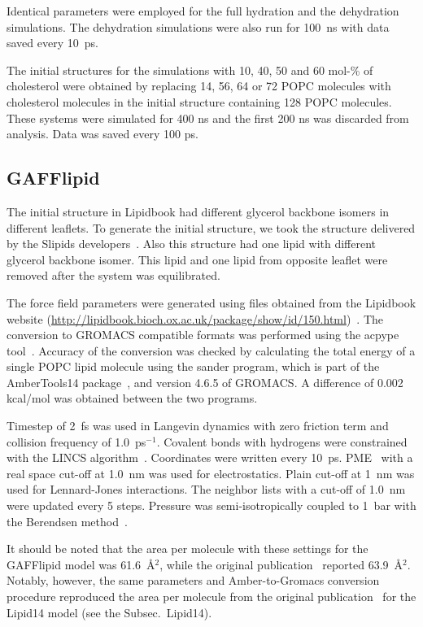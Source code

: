 \documentclass[journal=jacsat,manuscript=article]{achemso}
\begin{document}
Identical parameters were employed for the full hydration and the dehydration simulations. The dehydration simulations were also run for 100~ns 
with data saved every 10~ps.

The initial structures for the simulations with 10, 40, 50 and 60 mol-\% of cholesterol were obtained by replacing 14, 56, 64 or 72 POPC molecules 
with cholesterol molecules in the initial structure containing 128 POPC molecules. These systems were simulated for 400 ns and the first 200 ns was 
discarded from analysis. Data was saved every 100 ps.



\subsection{GAFFlipid}
The initial structure in Lipidbook \cite{domanski10} had different glycerol backbone isomers in different leaflets. 
To generate the initial structure, we took the structure delivered by the Slipids developers~\cite{jambeck12b}. Also this structure
had one lipid with different glycerol backbone isomer. This lipid and one lipid from opposite leaflet were removed
after the system was equilibrated.

The force field parameters were generated using files obtained from the Lipidbook website (\url{http://lipidbook.bioch.ox.ac.uk/package/show/id/150.html})~\cite{domanski10}. 
The conversion to GROMACS compatible formats was performed using the acpype tool~\cite{silva12}. Accuracy of the conversion was checked by calculating 
the total energy of a single POPC lipid molecule using the sander program, which is part of the AmberTools14 package~\cite{ferrer13}, and version 4.6.5 of GROMACS. 
A difference of 0.002 kcal/mol was obtained between the two programs.

Timestep of 2~fs was used in Langevin dynamics with zero friction term and collision frequency of 1.0~ps$^{-1}$. 
Covalent bonds with hydrogens were constrained with the LINCS algorithm~\cite{hess97,hess07}.
Coordinates were written every 10~ps. PME~\cite{darden93,essman95} with a real space cut-off at 1.0~nm was used 
for electrostatics. Plain cut-off at 1~nm was used for Lennard-Jones interactions. 
The neighbor lists with a cut-off of 1.0~nm were updated every 5 steps. 
Pressure was semi-isotropically coupled to 1~bar with the Berendsen method~\cite{berendsen84}.

It should be noted that the area per molecule with these settings for the GAFFlipid model was 61.6~\AA$^2$,
while the original publication~\cite{dickson12} reported 63.9~\AA$^2$. Notably, however, the same parameters and Amber-to-Gromacs
conversion procedure reproduced the area per molecule from the original publication~\cite{dickson14} for the Lipid14 model (see the Subsec.~Lipid14).
\end{document}
